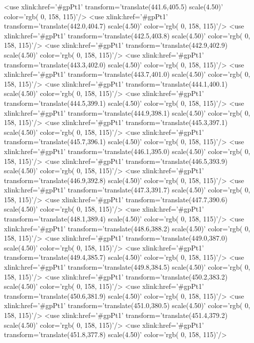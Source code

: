 	<use xlink:href='#gpPt1' transform='translate(441.6,405.5) scale(4.50)' color='rgb(  0, 158, 115)'/>
	<use xlink:href='#gpPt1' transform='translate(442.0,404.7) scale(4.50)' color='rgb(  0, 158, 115)'/>
	<use xlink:href='#gpPt1' transform='translate(442.5,403.8) scale(4.50)' color='rgb(  0, 158, 115)'/>
	<use xlink:href='#gpPt1' transform='translate(442.9,402.9) scale(4.50)' color='rgb(  0, 158, 115)'/>
	<use xlink:href='#gpPt1' transform='translate(443.3,402.0) scale(4.50)' color='rgb(  0, 158, 115)'/>
	<use xlink:href='#gpPt1' transform='translate(443.7,401.0) scale(4.50)' color='rgb(  0, 158, 115)'/>
	<use xlink:href='#gpPt1' transform='translate(444.1,400.1) scale(4.50)' color='rgb(  0, 158, 115)'/>
	<use xlink:href='#gpPt1' transform='translate(444.5,399.1) scale(4.50)' color='rgb(  0, 158, 115)'/>
	<use xlink:href='#gpPt1' transform='translate(444.9,398.1) scale(4.50)' color='rgb(  0, 158, 115)'/>
	<use xlink:href='#gpPt1' transform='translate(445.3,397.1) scale(4.50)' color='rgb(  0, 158, 115)'/>
	<use xlink:href='#gpPt1' transform='translate(445.7,396.1) scale(4.50)' color='rgb(  0, 158, 115)'/>
	<use xlink:href='#gpPt1' transform='translate(446.1,395.0) scale(4.50)' color='rgb(  0, 158, 115)'/>
	<use xlink:href='#gpPt1' transform='translate(446.5,393.9) scale(4.50)' color='rgb(  0, 158, 115)'/>
	<use xlink:href='#gpPt1' transform='translate(446.9,392.8) scale(4.50)' color='rgb(  0, 158, 115)'/>
	<use xlink:href='#gpPt1' transform='translate(447.3,391.7) scale(4.50)' color='rgb(  0, 158, 115)'/>
	<use xlink:href='#gpPt1' transform='translate(447.7,390.6) scale(4.50)' color='rgb(  0, 158, 115)'/>
	<use xlink:href='#gpPt1' transform='translate(448.1,389.4) scale(4.50)' color='rgb(  0, 158, 115)'/>
	<use xlink:href='#gpPt1' transform='translate(448.6,388.2) scale(4.50)' color='rgb(  0, 158, 115)'/>
	<use xlink:href='#gpPt1' transform='translate(449.0,387.0) scale(4.50)' color='rgb(  0, 158, 115)'/>
	<use xlink:href='#gpPt1' transform='translate(449.4,385.7) scale(4.50)' color='rgb(  0, 158, 115)'/>
	<use xlink:href='#gpPt1' transform='translate(449.8,384.5) scale(4.50)' color='rgb(  0, 158, 115)'/>
	<use xlink:href='#gpPt1' transform='translate(450.2,383.2) scale(4.50)' color='rgb(  0, 158, 115)'/>
	<use xlink:href='#gpPt1' transform='translate(450.6,381.9) scale(4.50)' color='rgb(  0, 158, 115)'/>
	<use xlink:href='#gpPt1' transform='translate(451.0,380.5) scale(4.50)' color='rgb(  0, 158, 115)'/>
	<use xlink:href='#gpPt1' transform='translate(451.4,379.2) scale(4.50)' color='rgb(  0, 158, 115)'/>
	<use xlink:href='#gpPt1' transform='translate(451.8,377.8) scale(4.50)' color='rgb(  0, 158, 115)'/>
